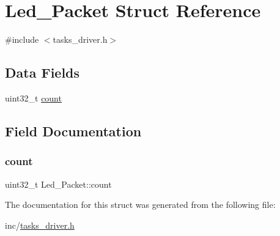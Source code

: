 \hypertarget{struct_led___packet}{}\section{Led\+\_\+\+Packet Struct Reference}
\label{struct_led___packet}


{\ttfamily \#include $<$tasks\+\_\+driver.\+h$>$}

\subsection*{Data Fields}
\begin{DoxyCompactItemize}
\item 
uint32\+\_\+t \mbox{\hyperlink{struct_led___packet_a08eb84c4c4136836dde3075d928351d9}{count}}
\end{DoxyCompactItemize}


\subsection{Field Documentation}
\mbox{\label{struct_led___packet_a08eb84c4c4136836dde3075d928351d9}} 
\subsubsection{\texorpdfstring{count}{count}}
{\footnotesize\ttfamily uint32\+\_\+t Led\+\_\+\+Packet\+::count}



The documentation for this struct was generated from the following file\+:\begin{DoxyCompactItemize}
\item 
inc/\mbox{\hyperlink{tasks__driver_8h}{tasks\+\_\+driver.\+h}}\end{DoxyCompactItemize}
